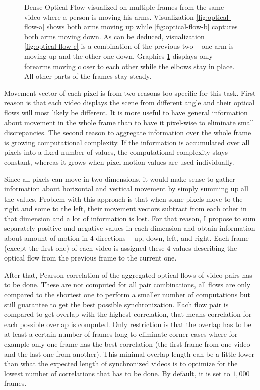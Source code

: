 \begin{figure}[!ht]
\begin{subfigure}[b]{0.244\textwidth}
        \caption{}
        \label{fig:optical-flow-d}
    \end{subfigure}
    \caption{Dense Optical Flow visualized on multiple frames from the same video where a person is moving his arms. Visualization \ref{fig:optical-flow-a} shows both arms moving up while \ref{fig:optical-flow-b} captures both arms moving down. As can be deduced, visualization \ref{fig:optical-flow-c} is a combination of the previous two -- one arm is moving up and the other one down. Graphics \ref{fig:optical-flow-d} displays only forearms moving closer to each other while the elbows stay in place. All other parts of the frames stay steady.}
    \label{fig:optical-flow}
\end{figure}

Movement vector of each pixel is from two reasons too specific for this task. First reason is that each video displays the scene from different angle and their optical flows will most likely be different. It is more useful to have general information about movement in the whole frame than to have it pixel-wise to eliminate small discrepancies. The second reason to aggregate information over the whole frame is growing computational complexity. If the information is accumulated over all pixels into a fixed number of values, the computational complexity stays constant, whereas it grows when pixel motion values are used individually. 

Since all pixels can move in two dimensions, it would make sense to gather information about horizontal and vertical movement by simply summing up all the values. Problem with this approach is that when some pixels move to the right and some to the left, their movement vectors subtract from each other in that dimension and a lot of information is lost. For that reason, I propose to sum separately positive and negative values in each dimension and obtain information about amount of motion in 4 directions -- up, down, left, and right. Each frame (except the first one) of each video is assigned these 4 values describing the optical flow from the previous frame to the current one.

After that, Pearson correlation of the aggregated optical flows of video pairs has to be done. These are not computed for all pair combinations, all flows are only compared to the shortest one to perform a smaller number of computations but still guarantee to get the best possible synchronization. Each flow pair is compared to get overlap with the highest correlation, that means correlation for each possible overlap is computed. Only restriction is that the overlap has to be at least a certain number of frames long to eliminate corner cases where for example only one frame has the best correlation (the first frame from one video and the last one from another). This minimal overlap length can be a little lower than what the expected length of synchronized videos is to optimize for the lowest number of correlations that has to be done. By default, it is set to $1{,}000$ frames.


